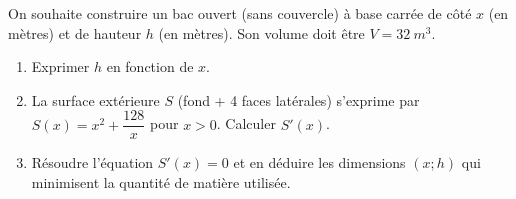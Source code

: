 \documentclass[11pt]{article}
\begin{document}
\begin{exercice}
On souhaite construire un bac ouvert (sans couvercle) à base carrée de côté $x$ (en mètres) et de hauteur $h$ (en mètres). Son volume doit être $V = \SI{32}{m^3}$.
\begin{enumerate}
    \item Exprimer $h$ en fonction de $x$.
    \item La surface extérieure $S$ (fond + 4 faces latérales) s'exprime par $S(x) = x^2 + \dfrac{128}{x}$ pour $x > 0$. Calculer $S'(x)$.
    \item Résoudre l'équation $S'(x) = 0$ et en déduire les dimensions $(x ; h)$ qui minimisent la quantité de matière utilisée.
\end{enumerate}
\end{exercice}
\end{document}
